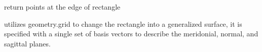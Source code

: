 \documentclass[letterpaper,10pt,english]{sphinxmanual}
\begin{document}
\begin{fulllineitems}
\begin{fulllineitems}
\label{TRIPPy:TRIPPy.surface.Rect.area}
\end{fulllineitems}


\begin{fulllineitems}
\label{TRIPPy:TRIPPy.surface.Rect.edge}
return points at the edge of rectangle

\end{fulllineitems}


\begin{fulllineitems}
\label{TRIPPy:TRIPPy.surface.Rect.edgetest}
\end{fulllineitems}


\begin{fulllineitems}
\label{TRIPPy:TRIPPy.surface.Rect.split}
utilizes geometry.grid to change the rectangle into a generalized surface,
it is specified with a single set of basis vectors to describe the meridonial,
normal, and sagittal planes.

\end{fulllineitems}


\end{fulllineitems}

\end{document}
